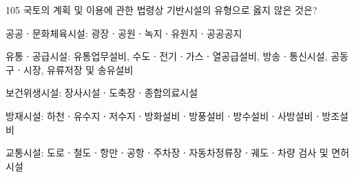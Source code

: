 \begin{question}{105}
국토의 계획 및 이용에 관한 법령상 기반시설의 유형으로 옳지 않은 것은?
\begin{choices}
  \item 공공ㆍ문화체육시설: 광장ㆍ공원ㆍ녹지ㆍ유원지ㆍ공공공지
  \item 유통ㆍ공급시설: 유통업무설비, 수도ㆍ전기ㆍ가스ㆍ열공급설비, 방송ㆍ통신시설, 공동구ㆍ시장, 유류저장 및 송유설비
  \item 보건위생시설: 장사시설ㆍ도축장ㆍ종합의료시설
  \item 방재시설: 하천ㆍ유수지ㆍ저수지ㆍ방화설비ㆍ방풍설비ㆍ방수설비ㆍ사방설비ㆍ방조설비
  \item 교통시설: 도로ㆍ철도ㆍ항만ㆍ공항ㆍ주차장ㆍ자동차정류장ㆍ궤도ㆍ차량 검사 및 면허 시설
\end{choices}
\end{question}
